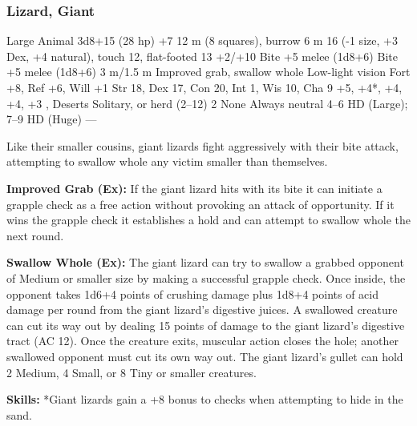 \subsubsection{Lizard, Giant}
\begin{MonsterStats}
{Large Animal}
{3d8+15 (28 hp)}
{+7}
{12 m (8 squares), burrow 6 m}
{16 (-1 size, +3 Dex, +4 natural), touch 12, flat-footed 13}
{+2/+10}
{Bite +5 melee (1d8+6)}
{Bite +5 melee (1d8+6)}
{3 m/1.5 m}
{Improved grab, swallow whole}
{Low-light vision}
{Fort +8, Ref +6, Will +1}
{Str 18, Dex 17, Con 20, Int 1, Wis 10, Cha 9}
{ +5,  +4*,  +4,  +4,  +3}
{, }
{Deserts}
{Solitary, or herd (2--12)}
{2}
{None}
{Always neutral}
{4--6 HD (Large); 7--9 HD (Huge)}
{---}
\end{MonsterStats}


Like their smaller cousins, giant lizards fight aggressively with their bite attack, attempting to swallow whole any victim smaller than themselves.

\textbf{Improved Grab (Ex):} If the giant lizard hits with its bite it can initiate a grapple check as a free action without provoking an attack of opportunity. If it wins the grapple check it establishes a hold and can attempt to swallow whole the next round.

\textbf{Swallow Whole (Ex):} The giant lizard can try to swallow a grabbed opponent of Medium or smaller size by making a successful grapple check. Once inside, the opponent takes 1d6+4 points of crushing damage plus 1d8+4 points of acid damage per round from the giant lizard's digestive juices. A swallowed creature can cut its way out by dealing 15 points of damage to the giant lizard's digestive tract (AC 12). Once the creature exits, muscular action closes the hole; another swallowed opponent must cut its own way out. The giant lizard's gullet can hold 2 Medium, 4 Small, or 8 Tiny or smaller creatures.

\textbf{Skills:} *Giant lizards gain a +8 bonus to  checks when attempting to hide in the sand.
